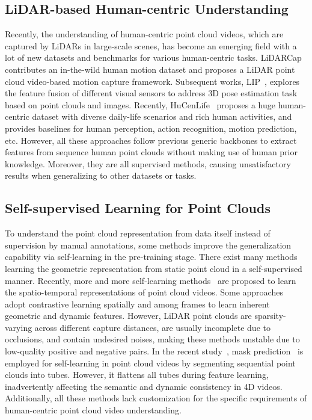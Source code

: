 \subsection{LiDAR-based Human-centric Understanding}
Recently, the understanding of human-centric point cloud videos, which are captured by LiDARs in large-scale scenes, has become an emerging field with a lot of new datasets and benchmarks for various human-centric tasks. 
LiDARCap~\cite{li2022lidarcap} contributes an in-the-wild human motion dataset and proposes a LiDAR point cloud video-based motion capture framework. Subsequent works, LIP~\cite{ren2023lidar}, explores the feature fusion of different visual sensors to address 3D pose estimation task based on point clouds and images. 
Recently, HuCenLife~\cite{xu2023human} proposes a huge human-centric dataset with diverse daily-life scenarios and rich human activities, and provides baselines for human perception, action recognition, motion prediction, etc. However, all these approaches follow previous generic backbones to extract features from sequence human point clouds without making use of human prior knowledge. Moreover, they are all supervised methods, causing unsatisfactory results when generalizing to other datasets or tasks.


\subsection{Self-supervised Learning for Point Clouds}
To understand the point cloud representation from data itself instead of supervision by manual annotations, some methods improve the generalization capability via self-learning in the pre-training stage. There exist many methods~\cite{xie2020pointcontrast,yu2022point,pang2022masked,zhang2022point,chen2023pointgpt} learning the geometric representation from static point cloud in a self-supervised manner. Recently, more and more self-learning methods~\cite{wang2021self,zhang2023complete} are proposed to learn the spatio-temporal representations of point cloud videos. Some approaches~\cite{sheng2023contrastive,sheng2023point,shen2023pointcmp} adopt contrastive learning spatially and among frames to learn inherent geometric and dynamic features. However, LiDAR point clouds are sparsity-varying across different capture distances, are usually incomplete due to occlusions, and contain undesired noises, making these methods unstable due to low-quality positive and negative pairs. In the recent study~\cite{shen2023masked}, mask prediction~\cite{he2022masked} is employed for self-learning in point cloud videos by segmenting sequential point clouds into tubes. However, it flattens all tubes during feature learning, inadvertently affecting the semantic and dynamic consistency in 4D videos. Additionally, all these methods lack customization for the specific requirements of human-centric point cloud video understanding.


